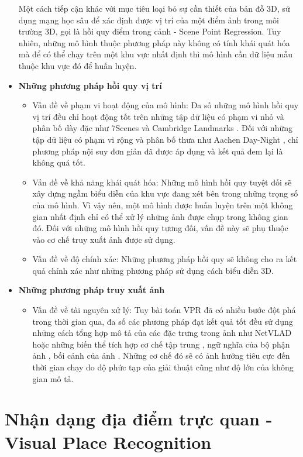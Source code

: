 \begin{itemize}
    Một cách tiếp cận khác với mục tiêu loại bỏ sự cần thiết của bản đồ 3D, sử dụng mạng học sâu để xác định được vị trí của một điểm ảnh trong môi trường 3D, gọi là hồi quy điểm trong cảnh - Scene Point Regression. Tuy nhiên, những mô hình thuộc phương pháp này không có tính khái quát hóa mà để có thể chạy trên một khu vực nhất định thì mô hình cần dữ liệu mẫu thuộc khu vực đó để huấn luyện.
    \item \textbf{Những phương pháp hồi quy vị trí}
    \begin{itemize}
        \item Vấn đề về phạm vi hoạt động của mô hình: Đa số những mô hình hồi quy vị trí đều chỉ hoạt động tốt trên những tập dữ liệu có phạm vi nhỏ và phân bố dày đặc như 7Scenes \cite{6619221} và Cambridge Landmarks \cite{kendall2016posenet}. Đối với những tập dữ liệu có phạm vi rộng và phân bố thưa như Aachen Day-Night \cite{Sattler2012ImageRF}, chỉ phương pháp nội suy đơn giản đã được áp dụng và kết quả đem lại là không quá tốt.
        \item Vấn đề về khả năng khái quát hóa: Những mô hình hồi quy tuyệt đối sẽ xây dựng ngầm biểu diễn của khu vực đang xét bên trong những trọng số của mô hình. Vì vậy nên, một mô hình được huấn luyện trên một không gian nhất định chỉ có thể xử lý những ảnh được chụp trong không gian đó. Đối với những mô hình hồi quy tương đối, vấn đề này sẽ phụ thuộc vào cơ chế truy xuất ảnh được sử dụng.
        \item Vấn đề về độ chính xác: Những phương pháp hồi quy sẽ không cho ra kết quả chính xác như những phương pháp sử dụng cách biểu diễn 3D.
    \end{itemize}
    \item \textbf{Những phương pháp truy xuất ảnh}
    \begin{itemize}
        \item Vấn đề về tài nguyên xử lý: Tuy bài toán VPR đã có nhiều bước đột phá trong thời gian qua, đa số các phương pháp đạt kết quả tốt đều sử dụng những cách tổng hợp mô tả của các đặc trưng trong ảnh như NetVLAD \cite{arandjelović2016netvlad} hoặc những biến thể tích hợp cơ chế tập trung \cite{keetha2023anyloc}, ngữ nghĩa của bộ phận ảnh \cite{peng2021semantic}, bối cảnh của ảnh \cite{jin2017learned}. Những cơ chế đó sẽ có ảnh hưởng tiêu cực đến thời gian chạy do độ phức tạp của giải thuật cũng như độ lớn của không gian mô tả.
    \end{itemize}
\end{itemize}

\section{Nhận dạng địa điểm trực quan - Visual Place Recognition}

